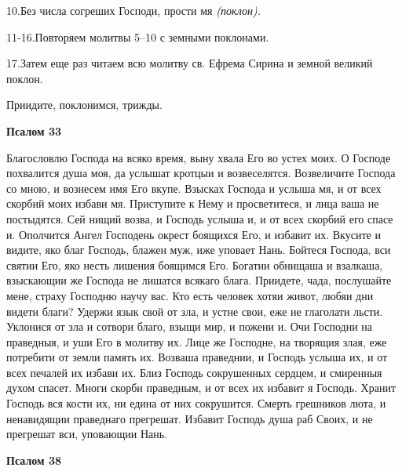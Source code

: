 10.Без числа согреших Господи, прости мя \itshape (поклон)\normalfont{}.


11-16.Повторяем молитвы 5–10 с земными поклонами.


17.Затем еще раз читаем всю молитву св. Ефрема Сирина и земной великий поклон.



Приидите, поклонимся, трижды.





\bfseries Псалом 33\normalfont{}


Благословлю Господа на всяко время, выну хвала Его во устех моих. О Господе похвалится душа моя, да услышат кротцыи и возвеселятся. Возвеличите Господа со мною, и вознесем имя Его вкупе. Взысках Господа и услыша мя, и от всех скорбий моих избави мя. Приступите к Нему и просветитеся, и лица ваша не постыдятся. Сей нищий возва, и Господь услыша и, и от всех скорбий его спасе и. Ополчится Ангел Господень окрест боящихся Его, и избавит их. Вкусите и видите, яко благ Господь, блажен муж, иже уповает Нань. Бойтеся Господа, вси святии Его, яко несть лишения боящимся Его. Богатии обнищаша и взалкаша, взыскающии же Господа не лишатся всякаго блага. Приидете, чада, послушайте мене, страху Господню научу вас. Кто есть человек хотяи живот, любяи дни видети благи? Удержи язык свой от зла, и устне свои, еже не глаголати льсти. Уклонися от зла и сотвори благо, взыщи мир, и пожени и. Очи Господни на праведныя, и уши Его в молитву их. Лице же Господне, на творящия злая, еже потребити от земли память их. Возваша праведнии, и Господь услыша их, и от всех печалей их избави их. Близ Господь сокрушенных сердцем, и смиренныя духом спасет. Многи скорби праведным, и от всех их избавит я Господь. Хранит Господь вся кости их, ни едина от них сокрушится. Смерть грешников люта, и ненавидящии праведнаго прегрешат. Избавит Господь душа раб Своих, и не прегрешат вси, уповающии Нань.





\bfseries Псалом 38\normalfont{}


